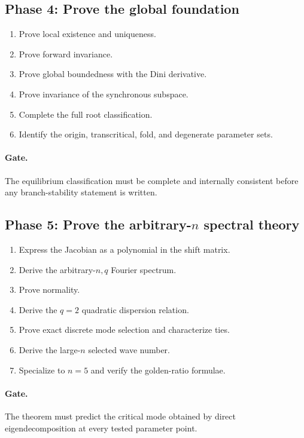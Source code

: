 \documentclass[11pt, reqno]{amsart}
\theoremstyle{definition}
\theoremstyle{remark}
\begin{document}
	\subsection{Phase 4: Prove the global foundation}
	
	\begin{enumerate}[label=4.\arabic*,leftmargin=3em]
		\item Prove local existence and uniqueness.
		\item Prove forward invariance.
		\item Prove global boundedness with the Dini derivative.
		\item Prove invariance of the synchronous subspace.
		\item Complete the full root classification.
		\item Identify the origin, transcritical, fold, and degenerate parameter
		sets.
	\end{enumerate}
	
	\paragraph{Gate.}
	The equilibrium classification must be complete and internally consistent
	before any branch-stability statement is written.
	
	\subsection{Phase 5: Prove the arbitrary-$n$ spectral theory}
	
	\begin{enumerate}[label=5.\arabic*,leftmargin=3em]
		\item Express the Jacobian as a polynomial in the shift matrix.
		\item Derive the arbitrary-$n,q$ Fourier spectrum.
		\item Prove normality.
		\item Derive the $q=2$ quadratic dispersion relation.
		\item Prove exact discrete mode selection and characterize ties.
		\item Derive the large-$n$ selected wave number.
		\item Specialize to $n=5$ and verify the golden-ratio formulae.
	\end{enumerate}
	
	\paragraph{Gate.}
	The theorem must predict the critical mode obtained by direct eigendecomposition
	at every tested parameter point.
	
\end{document}
